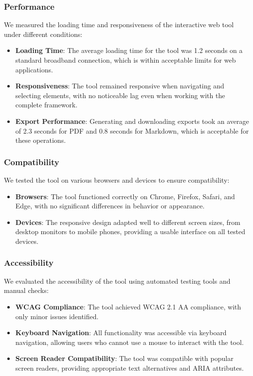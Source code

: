 \documentclass[conference]{IEEEtran}
\begin{document}
\subsubsection{Performance}

We measured the loading time and responsiveness of the interactive web tool under different conditions:

\begin{itemize}
    \item \textbf{Loading Time}: The average loading time for the tool was 1.2 seconds on a standard broadband connection, which is within acceptable limits for web applications.
    \item \textbf{Responsiveness}: The tool remained responsive when navigating and selecting elements, with no noticeable lag even when working with the complete framework.
    \item \textbf{Export Performance}: Generating and downloading exports took an average of 2.3 seconds for PDF and 0.8 seconds for Markdown, which is acceptable for these operations.
\end{itemize}

\subsubsection{Compatibility}

We tested the tool on various browsers and devices to ensure compatibility:

\begin{itemize}
    \item \textbf{Browsers}: The tool functioned correctly on Chrome, Firefox, Safari, and Edge, with no significant differences in behavior or appearance.
    \item \textbf{Devices}: The responsive design adapted well to different screen sizes, from desktop monitors to mobile phones, providing a usable interface on all tested devices.
\end{itemize}

\subsubsection{Accessibility}

We evaluated the accessibility of the tool using automated testing tools and manual checks:

\begin{itemize}
    \item \textbf{WCAG Compliance}: The tool achieved WCAG 2.1 AA compliance, with only minor issues identified.
    \item \textbf{Keyboard Navigation}: All functionality was accessible via keyboard navigation, allowing users who cannot use a mouse to interact with the tool.
    \item \textbf{Screen Reader Compatibility}: The tool was compatible with popular screen readers, providing appropriate text alternatives and ARIA attributes.
\end{itemize}
\end{document}
